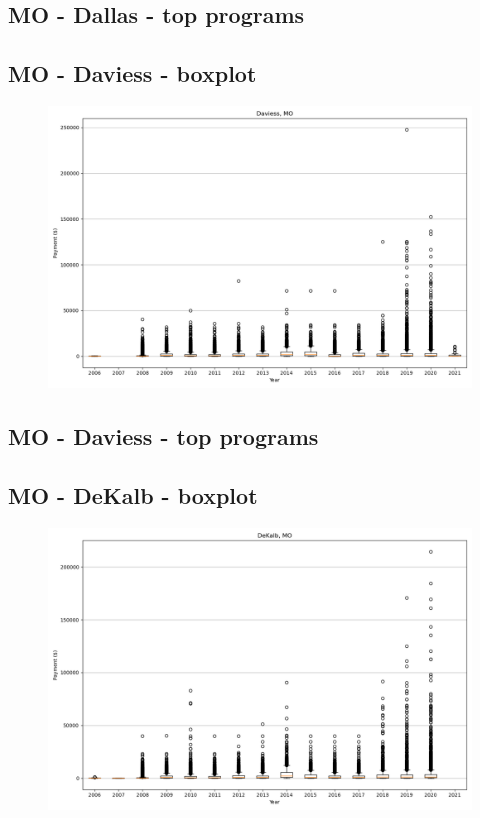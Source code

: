 \subsection*{MO - Dallas - top programs}

\newpage
\subsection*{MO - Daviess - boxplot}
\begin{figure}[h]
\centering
\includegraphics[width=7in]{../output/boxplots/counties/Daviess-MO_boxplot.png}
\end{figure}


\subsection*{MO - Daviess - top programs}

\newpage
\subsection*{MO - DeKalb - boxplot}
\begin{figure}[h]
\centering
\includegraphics[width=7in]{../output/boxplots/counties/DeKalb-MO_boxplot.png}
\end{figure}


